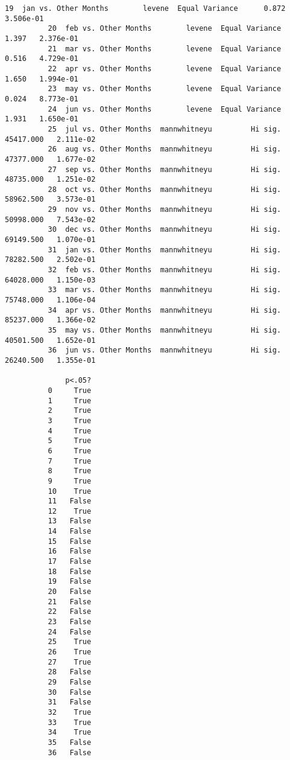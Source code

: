 \documentclass[11pt]{article}
\begin{document}
\begin{Verbatim}[commandchars=\\\{\}]
          19  jan vs. Other Months        levene  Equal Variance      0.872   3.506e-01   
          20  feb vs. Other Months        levene  Equal Variance      1.397   2.376e-01   
          21  mar vs. Other Months        levene  Equal Variance      0.516   4.729e-01   
          22  apr vs. Other Months        levene  Equal Variance      1.650   1.994e-01   
          23  may vs. Other Months        levene  Equal Variance      0.024   8.773e-01   
          24  jun vs. Other Months        levene  Equal Variance      1.931   1.650e-01   
          25  jul vs. Other Months  mannwhitneyu         Hi sig.  45417.000   2.111e-02   
          26  aug vs. Other Months  mannwhitneyu         Hi sig.  47377.000   1.677e-02   
          27  sep vs. Other Months  mannwhitneyu         Hi sig.  48735.000   1.251e-02   
          28  oct vs. Other Months  mannwhitneyu         Hi sig.  58962.500   3.573e-01   
          29  nov vs. Other Months  mannwhitneyu         Hi sig.  50998.000   7.543e-02   
          30  dec vs. Other Months  mannwhitneyu         Hi sig.  69149.500   1.070e-01   
          31  jan vs. Other Months  mannwhitneyu         Hi sig.  78282.500   2.502e-01   
          32  feb vs. Other Months  mannwhitneyu         Hi sig.  64028.000   1.150e-03   
          33  mar vs. Other Months  mannwhitneyu         Hi sig.  75748.000   1.106e-04   
          34  apr vs. Other Months  mannwhitneyu         Hi sig.  85237.000   1.366e-02   
          35  may vs. Other Months  mannwhitneyu         Hi sig.  40501.500   1.652e-01   
          36  jun vs. Other Months  mannwhitneyu         Hi sig.  26240.500   1.355e-01   
          
              p<.05?  
          0     True  
          1     True  
          2     True  
          3     True  
          4     True  
          5     True  
          6     True  
          7     True  
          8     True  
          9     True  
          10    True  
          11   False  
          12    True  
          13   False  
          14   False  
          15   False  
          16   False  
          17   False  
          18   False  
          19   False  
          20   False  
          21   False  
          22   False  
          23   False  
          24   False  
          25    True  
          26    True  
          27    True  
          28   False  
          29   False  
          30   False  
          31   False  
          32    True  
          33    True  
          34    True  
          35   False  
          36   False  
\end{Verbatim}
            
\end{document}
